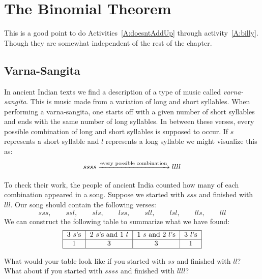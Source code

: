 \newpage



\section{The Binomial Theorem}

\begin{teachingnote}
This is a good point to do Activities~\ref{A:doesntAddUp} through
activity~\ref{A:billy}. Though they are somewhat independent of the
rest of the chapter.
\end{teachingnote}


\subsection{Varna-Sangita}

In ancient Indian texts we find a description of a type of music
called \textit{varna-sangita}. This is music made
from a variation of long and short syllables. When performing a
varna-sangita, one starts off with a given number of short syllables
and ends with the same number of long syllables. In between these
verses, every possible combination of long and short syllables is
supposed to occur. If $s$ represents a short syllable and $l$
represents a long syllable we might visualize this as:
\[
ssss  \xrightarrow{\text{every possible combination}} llll
\]

To check their work, the people of ancient India counted how many of
each combination appeared in a song. Suppose we started with $sss$ and
finished with $lll$. Our song should contain the following verses:
\[
sss,\qquad ssl,\qquad sls, \qquad lss, \qquad sll,\qquad lsl, \qquad lls,\qquad lll
\]
We can construct the following table to summarize what we have found:
\[
\begin{tabular}{|c|c|c|c|}\hline
$3$ $s$'s & $2$ $s$'s and $1$ $l$ & $1$ $s$ and $2$ $l$'s & $3$ $l$'s \\ \hline
1 & 3 & 3 & 1\\\hline
\end{tabular}
\]

\begin{question} 
What would your table look like if you started with $ss$ and finished
with $ll$? What about if you started with $ssss$ and finished with
$llll$?
\end{question}
\QM

